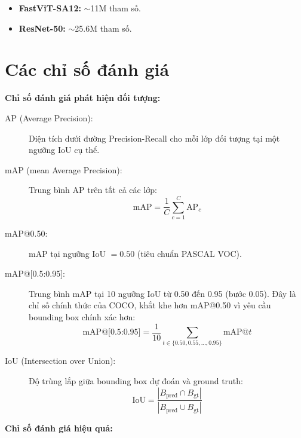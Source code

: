 \begin{itemize}
    \item \textbf{FastViT-SA12:} $\sim$11M tham số.
    \item \textbf{ResNet-50:} $\sim$25.6M tham số.
\end{itemize}

\section{Các chỉ số đánh giá}
\label{sec:metrics}

\textbf{Chỉ số đánh giá phát hiện đối tượng:}

\begin{description}
    \item[AP (Average Precision):] Diện tích dưới đường Precision-Recall cho mỗi lớp đối tượng tại một ngưỡng IoU cụ thể.
    
    \item[mAP (mean Average Precision):] Trung bình AP trên tất cả các lớp:
    \begin{equation}
        \text{mAP} = \frac{1}{C} \sum_{c=1}^{C} \text{AP}_c
    \end{equation}
    
    \item[mAP@0.50:] mAP tại ngưỡng IoU $= 0.50$ (tiêu chuẩn PASCAL VOC).
    
    \item[mAP@{[}0.5:0.95{]}:] Trung bình mAP tại 10 ngưỡng IoU từ 0.50 đến 0.95 (bước 0.05). Đây là chỉ số chính thức của COCO, khắt khe hơn mAP@0.50 vì yêu cầu bounding box chính xác hơn:
    \begin{equation}
        \text{mAP@[0.5:0.95]} = \frac{1}{10} \sum_{t \in \{0.50, 0.55, \ldots, 0.95\}} \text{mAP@}t
    \end{equation}
    
    \item[IoU (Intersection over Union):] Độ trùng lắp giữa bounding box dự đoán và ground truth:
    \begin{equation}
        \text{IoU} = \frac{|B_{\text{pred}} \cap B_{\text{gt}}|}{|B_{\text{pred}} \cup B_{\text{gt}}|}
    \end{equation}
\end{description}

\textbf{Chỉ số đánh giá hiệu quả:}

